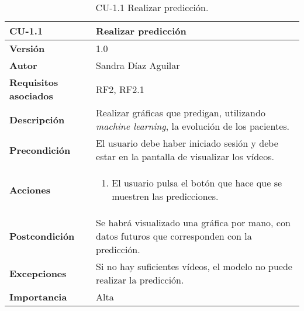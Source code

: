 \begin{table}[p]
	\centering
	\begin{tabularx}{\linewidth}{ p{} p{} }
		\toprule
		\textbf{CU-1.1}    & \textbf{Realizar predicción}\\
		\toprule
		\textbf{Versión}              & 1.0    \\
		\textbf{Autor}                & Sandra Díaz Aguilar \\
		\textbf{Requisitos asociados} & RF2, RF2.1 \\
		\textbf{Descripción}          & Realizar gráficas que predigan, utilizando \textit{machine learning}, la evolución de los pacientes.  \\
		\textbf{Precondición}         & El usuario debe haber iniciado sesión y debe estar en la pantalla de visualizar los vídeos.  \\
		\textbf{Acciones}             &
		\begin{enumerate}
			\def\labelenumi{\arabic{enumi}.}
			\tightlist 
                \item El usuario pulsa el botón que hace que se muestren las predicciones. 
		\end{enumerate}\\
		\textbf{Postcondición}        & Se habrá visualizado una gráfica por mano, con datos futuros que corresponden con la predicción.  \\
		\textbf{Excepciones}          & Si no hay suficientes vídeos, el modelo no puede realizar la predicción.  \\
		\textbf{Importancia}          & Alta \\
		\bottomrule
	\end{tabularx}
	\caption{CU-1.1 Realizar predicción.}
\end{table}


